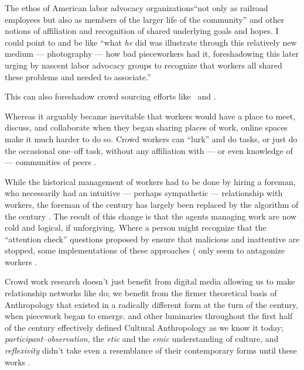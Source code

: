 \documentclass[trackingWork]{subfiles}
\begin{document}
The ethos of American labor advocacy organizations``not only as railroad employees but also as members of the larger life of the community''
and other notions of affiliation and recognition of shared underlying goals and hopes.
I could point to \citeauthor{riisOtherSideLives} and be like
``what \textit{he} did was illustrate through this relatively new medium --- photography ---
how bad pieceworkers had it, foreshadowing
this later urging by nascent labor advocacy groups to recognize that
workers all shared these problems and needed to associate.''

This can also foreshadow crowd sourcing efforts like
\TO~and \DO.



\subsubsubsection{\whatchanged}
Whereas it arguably became inevitable that workers would have a place to
meet, discuss, and collaborate
when they began sharing places of work,
online spaces make it much harder to do so.
Crowd workers can ``lurk'' and do tasks, or just do the occasional one--off task,
without any affiliation with
--- or even knowledge of ---
communities of peers
\cite{miller2011understanding,mcinnis2016one,earl2011digitally}.

While the historical management of workers had to be done by hiring a foreman,
who necessarily had an intuitive
--- perhaps sympathetic ---
relationship with workers,
the foreman of the  century has largely been replaced
by the algorithm of the  century
\cite{uberAlgorithm}.
The result of this change is that the agents managing work are now
cold and logical, if unforgiving.
Where a person might recognize that the ``attention check'' questions 
proposed by \citeauthor{le2010ensuring} ensure that malicious and inattentive are stopped,
some implementations of these approaches
(\cite[see][]{MaliciousCrowdworkersGadiraju}
only seem to antagonize workers
\cite{le2010ensuring,MaliciousCrowdworkersGadiraju}.



\subsubsubsection{\implication}
Crowd work research doesn't just benefit from
digital media allowing us to make
relationship networks like \citeauthor{crowdcollab} do;
we benefit from the firmer theoretical basis of Anthropology that
existed in a radically different form at the turn of the  century,
when piecework began to emerge.
\citeauthor{malinowski2002argonauts,boas1940race,mead1973coming} and
other luminaries throughout the first half of the  century
effectively defined Cultural Anthropology as we know it today;
\textit{participant--observation},
the \textit{etic} and the \textit{emic} understanding of culture, and
\textit{reflexivity}
didn't take even a resemblance of their contemporary forms until these works
\cite{malinowski2002argonauts,boas1940race,mead1973coming}.
\end{document}
